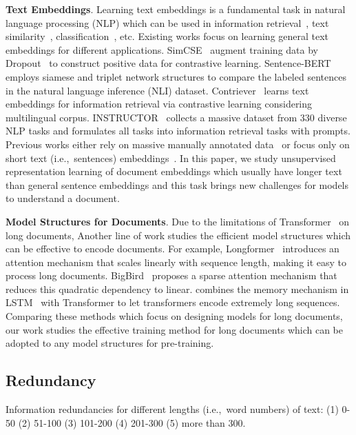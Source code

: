 \documentclass[11pt]{article}
\begin{document}
\textbf{Text Embeddings}. Learning text embeddings is a fundamental task in natural language processing (NLP) which can be used in information retrieval~\cite{Thakur2021BEIRAH}, text similarity~\cite{Gao2021SimCSESC}, classification~\cite{Minaee2021DeepLB}, etc. Existing works focus on learning general text embeddings for different applications. SimCSE~\cite{Gao2021SimCSESC} augment training data by Dropout~\cite{Srivastava2014DropoutAS} to construct positive data for contrastive learning. Sentence-BERT~\cite{Reimers2019SentenceBERTSE} employs siamese and triplet network structures to compare the labeled sentences in the natural language inference (NLI) dataset. Contriever~\cite{Izacard2021UnsupervisedDI} learns text embeddings for information retrieval via contrastive learning considering multilingual corpus. INSTRUCTOR~\cite{Su2022OneEA} collects a massive dataset from 330 diverse NLP tasks and formulates all tasks into information retrieval tasks with prompts. 
Previous works either rely on massive manually annotated data~\cite{Su2022OneEA, Reimers2019SentenceBERTSE} or focus only on short text (i.e.,~sentences) embeddings~\cite{Gao2021SimCSESC}.
In this paper, we study unsupervised representation learning of document embeddings which usually have longer text than general sentence embeddings and this task brings new challenges for models to understand a document.

\textbf{Model Structures for Documents}. Due to the limitations of Transformer~\cite{Vaswani2017AttentionIA} on long documents, Another line of work studies the efficient model structures which can be effective to encode documents. For example, Longformer~\cite{Beltagy2020LongformerTL} introduces an attention mechanism that scales linearly with sequence length, making it easy to process long documents. BigBird~\cite{Zaheer2020BigBT} proposes a sparse attention mechanism that reduces this quadratic dependency to linear. \citet{Bulatov2022RecurrentMT} combines the memory mechanism in LSTM~\cite{Hochreiter1997LongSM} with Transformer to let transformers encode extremely long sequences. Comparing these methods which focus on designing models for long documents, our work studies the effective training method for long documents which can be adopted to any model structures for pre-training.


\subsection{Redundancy}
\label{app:redundacy}
\begin{table}[t]
    
    \caption{Information redundancies for different lengths (i.e.,~word numbers) of text: (1) 0-50 (2) 51-100 (3) 101-200 (4) 201-300 (5) more than 300.}
    \label{redundancy}
\end{table}
\end{document}
